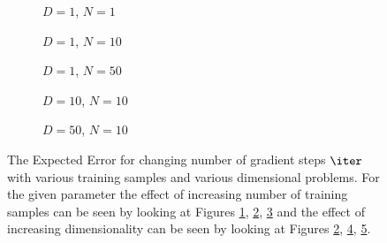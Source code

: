 \begin{figure}[!htb]
  \centering
    \begin{subfigure}{0.3\textwidth}
      \centering
      \caption{$D=1$, $N=1$}
      \label{fig:nonlinear-n_iter-N-1-D-1}
    \end{subfigure}
    \begin{subfigure}{0.3\textwidth}
      \centering
      \caption{$D=1$, $N=10$}
      \label{fig:nonlinear-n_iter-N-10-D-1}
    \end{subfigure}
    \begin{subfigure}{0.3\textwidth}
      \centering
      \caption{$D=1$, $N=50$}
      \label{fig:nonlinear-n_iter-N-50-D-1}
    \end{subfigure}

    \begin{subfigure}{0.3\textwidth}
      \centering
      \caption{$D=10$, $N=10$}
      \label{fig:nonlinear-n_iter-N-10-D-10}
    \end{subfigure}
    \begin{subfigure}{0.3\textwidth}
      \centering
      \caption{$D=50$, $N=10$}
      \label{fig:nonlinear-n_iter-N-10-D-50}
    \end{subfigure}  
  \caption{The Expected Error for changing number of gradient steps $\iter$ with various training samples and various dimensional problems. For the given parameter the effect of increasing number of training samples can be seen by looking at Figures \ref{fig:nonlinear-n_iter-N-1-D-1}, \ref{fig:nonlinear-n_iter-N-10-D-1}, \ref{fig:nonlinear-n_iter-N-50-D-1} and the effect of increasing dimensionality can be seen by looking at Figures \ref{fig:nonlinear-n_iter-N-10-D-1}, \ref{fig:nonlinear-n_iter-N-10-D-10}, \ref{fig:nonlinear-n_iter-N-10-D-50}.}\label{fig:nonlinear-n_iter}
\end{figure}


